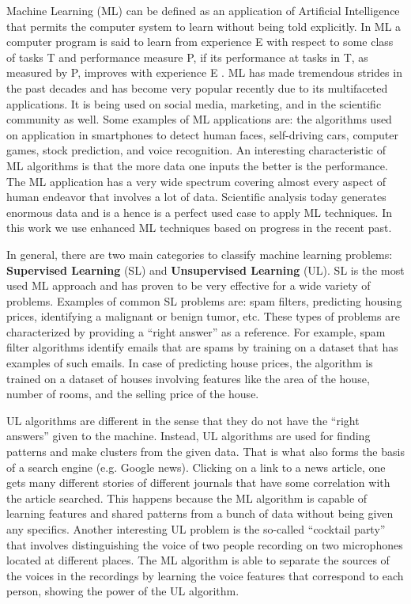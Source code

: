 
Machine Learning (ML) can be defined as an application of Artificial Intelligence that permits the computer system to learn without being told explicitly. 
In ML a computer program is said to learn from experience E with respect to some class of tasks T and performance measure P, if its performance at tasks in T, as measured by P, improves with experience E \cite{Coursera}.
 ML has made tremendous strides in the past decades and has become very popular recently due to its multifaceted applications. It is being used on social media, marketing, and in the scientific community as well. 
Some examples of ML applications are: the algorithms used on application in smartphones to detect human faces, self-driving cars, computer games, stock prediction, and voice recognition. An interesting characteristic of ML algorithms is that the more data one inputs the better is the performance. The ML application has a very wide spectrum covering almost every aspect of human endeavor that involves a lot of data. 
Scientific analysis today generates enormous data and is a hence is a perfect used case to apply ML techniques. In this work we use enhanced ML techniques based on progress in the recent past.

In general, there are two main categories to classify machine learning problems: \textbf{Supervised Learning} (SL) and \textbf{Unsupervised Learning} (UL). SL is the most used ML approach and has proven to be very effective for a wide variety of problems. Examples of common SL problems are: spam filters, predicting housing prices, identifying a malignant or benign tumor, etc. These types of problems are characterized by providing a “right answer” as a reference. For example, spam filter algorithms identify emails that are spams by training on a dataset that has examples of such emails. In case of predicting house prices, the algorithm is trained on a dataset of houses involving features like the area of the house, number of rooms, and the selling price of the house.

UL algorithms are different in the sense that they do not have the “right answers” given to the machine. Instead, UL algorithms are used for finding patterns and make clusters from the given data. That is what also forms the basis of a search engine (e.g. Google news). Clicking on a link to a news article, one gets many different stories of different journals that have some correlation with the article searched. This happens because the ML algorithm is capable of learning features and shared patterns from a bunch of data without being given any specifics. Another interesting UL problem is the so-called “cocktail party” that involves distinguishing the voice of two people recording on two microphones located at different places. The ML algorithm is able to separate the sources of the voices in the recordings by learning the voice features that correspond to each person, showing the power of the UL algorithm.

